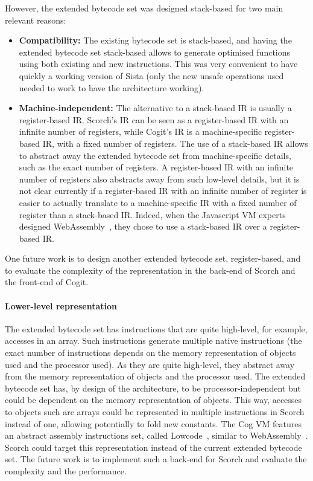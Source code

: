 \documentclass[a4paper,12pt,twoside]{../includes/ThesisStyle}
\begin{document}
However, the extended bytecode set was designed stack-based for two main relevant reasons:
\begin{itemize}
	\item \textbf{Compatibility:} The existing bytecode set is stack-based, and having the extended bytecode set stack-based allows to generate optimised functions using both existing and new instructions. This was very convenient to have quickly a working version of Sista (only the new unsafe operations used needed to work to have the architecture working).
	\item \textbf{Machine-independent:} The alternative to a stack-based IR is usually a register-based IR. Scorch's IR can be seen as a register-based IR with an infinite number of registers, while Cogit's IR is a machine-specific register-based IR, with a fixed number of registers. The use of a stack-based IR allows to abstract away the extended bytecode set from machine-specific details, such as the exact number of registers. A register-based IR with an infinite number of registers also abstracts away from such low-level details, but it is not clear currently if a register-based IR with an infinite number of register is easier to actually translate to a machine-specific IR with a fixed number of register than a stack-based IR. Indeed, when the Javascript VM experts designed WebAssembly~\cite{WebAssembly}, they chose to use a stack-based IR over a register-based IR.
\end{itemize}	 

One future work is to design another extended bytecode set, register-based, and to evaluate the complexity of the representation in the back-end of Scorch and the front-end of Cogit.

\paragraph{Lower-level representation}

The extended bytecode set has instructions that are quite high-level, for example, accesses in an array. Such instructions generate multiple native instructions (the exact number of instructions depends on the memory representation of objects used and the processor used). As they are quite high-level, they abstract away from the memory representation of objects and the processor used. The extended bytecode set has, by design of the architecture, to be processor-independent but could be dependent on the memory representation of objects. This way, accesses to objects such are arrays could be represented in multiple instructions in Scorch instead of one, allowing potentially to fold new constants. The Cog VM features an abstract assembly instructions set, called Lowcode~\cite{Salg16a}, similar to WebAssembly~\cite{WebAssembly}. Scorch could target this representation instead of the current extended bytecode set. The future work is to implement such a back-end for Scorch and evaluate the complexity and the performance.
\end{document}
